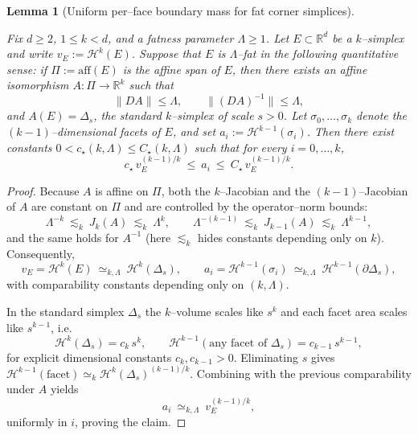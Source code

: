 \documentclass[11pt]{article}
\numberwithin{equation}{section}  %
\theoremstyle{plain}
\newtheorem{lemma}[theorem]{Lemma}
\theoremstyle{definition}
\theoremstyle{remark}
\newcommand{\R}{\mathbb{R}}
\begin{document}
\begin{lemma}[{Uniform per--face boundary mass for fat corner simplices}]\label{lem:corner-simplex-face-mass}

Fix $d\ge 2$, $1\le k<d$, and a fatness parameter $\Lambda\ge 1$.
Let $E\subset\R^d$ be a $k$--simplex and write $v_E:=\mathcal H^k(E)$.
Suppose that $E$ is \emph{$\Lambda$--fat} in the following quantitative sense: if $\Pi:=\mathrm{aff}(E)$ is the affine span of $E$, then there exists an affine isomorphism $A:\Pi\to\R^k$ such that
\[
\|DA\|\le \Lambda,\qquad \|(DA)^{-1}\|\le \Lambda,
\]
and $A(E)=\Delta_s$, the standard $k$--simplex of scale $s>0$.
Let $\sigma_0,\dots,\sigma_k$ denote the $(k-1)$--dimensional facets of $E$, and set $a_i:=\mathcal H^{k-1}(\sigma_i)$.
Then there exist constants $0<c_\star(k,\Lambda)\le C_\star(k,\Lambda)$ such that for every $i=0,\dots,k$,
\[
c_\star\, v_E^{(k-1)/k}\ \le\ a_i\ \le\ C_\star\, v_E^{(k-1)/k}.
\]

\end{lemma}

\begin{proof}

Because $A$ is affine on $\Pi$, both the $k$--Jacobian and the $(k-1)$--Jacobian of $A$ are constant on $\Pi$ and are controlled by the operator--norm bounds:
\[
\Lambda^{-k}\ \lesssim_k\ J_k(A)\ \lesssim_k\ \Lambda^{k},
\qquad
\Lambda^{-(k-1)}\ \lesssim_k\ J_{k-1}(A)\ \lesssim_k\ \Lambda^{k-1},
\]
and the same holds for $A^{-1}$ (here $\lesssim_k$ hides constants depending only on $k$).
Consequently,
\[
v_E=\mathcal H^k(E)\ \simeq_{k,\Lambda}\ \mathcal H^k(\Delta_s),
\qquad
a_i=\mathcal H^{k-1}(\sigma_i)\ \simeq_{k,\Lambda}\ \mathcal H^{k-1}(\partial\Delta_s),
\]
with comparability constants depending only on $(k,\Lambda)$.

In the standard simplex $\Delta_s$ the $k$--volume scales like $s^k$ and each facet area scales like $s^{k-1}$, i.e.
\[
\mathcal H^k(\Delta_s)=c_k\, s^k,
\qquad
\mathcal H^{k-1}(\text{any facet of }\Delta_s)=c_{k-1}\, s^{k-1},
\]
for explicit dimensional constants $c_k,c_{k-1}>0$.  Eliminating $s$ gives
$\mathcal H^{k-1}(\text{facet})\simeq_k \mathcal H^k(\Delta_s)^{(k-1)/k}$.
Combining with the previous comparability under $A$ yields
\[
a_i\ \simeq_{k,\Lambda}\ v_E^{(k-1)/k},
\]
uniformly in $i$, proving the claim.

\end{proof}
\end{document}
